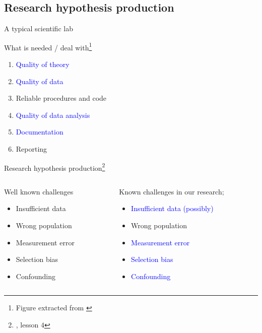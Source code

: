\subsection{Research hypothesis production}
%
%
\begin{frame}[t, negative]
	\subsectionpage
\end{frame}
%
%
\begin{lhframe}[rhgraphic={\texttt{[image: process\_models.png]}}]
	{A typical scientific lab}
	
	What is needed / deal with\footnote{Figure extracted from  \citet{McElreath_2020}} 
	\begin{enumerate}
		\item \textcolor{blue}{Quality of theory}
		\item \textcolor{blue}{Quality of data}
		\item \alert{Reliable procedures and code}
		\item \textcolor{blue}{Quality of data analysis}
		\item \textcolor{blue}{Documentation}
		\item Reporting
	\end{enumerate} 
\end{lhframe}
%
%
\begin{frame}
	{Research hypothesis production\footnote{\citet{Hernan_2020}, lesson $4$}}
	\begin{columns}
		\begin{column}{0.5\textwidth}
			Well known challenges
			\begin{itemize}
				\item Insufficient data
				\item Wrong population
				\item Measurement error
				\item Selection bias
				\item Confounding
			\end{itemize} 
		\end{column}
		\begin{column}{0.5\textwidth} 
			Known challenges in our research;
			\begin{itemize}
				\item \textcolor{blue}{Insufficient data (possibly)}
				\item Wrong population
				\item \textcolor{blue}{Measurement error}
				\item \textcolor{blue}{Selection bias}
				\item \textcolor{blue}{Confounding}
			\end{itemize} 
		\end{column}
	\end{columns}
\end{frame}
